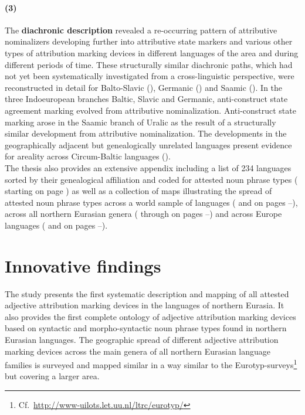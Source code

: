\paragraph{(3)} The {\bf diachronic description} revealed a re-occurring pattern of attributive nominalizers developing further into attributive state markers and various other types of attribution marking devices in different languages of the area and during different periods of time. These structurally similar diachronic paths, which had not yet been systematically investigated from a cross-linguistic perspective, were reconstructed in detail for Balto-Slavic (), Germanic () and Saamic (). In the three Indoeuropean branches Baltic, Slavic and Germanic, anti-construct state agreement marking evolved from attributive nominalization. Anti-construct state marking arose in the Saamic branch of Uralic as the result of a structurally similar development from attributive nominalization. The developments in the geographically adjacent but genealogically unrelated languages present evidence for areality across Circum-Baltic languages ().\\

\noindent The thesis also provides an extensive appendix including a list of 234 languages sorted by their genealogical affiliation and coded for attested noun phrase types ( starting on page \pageref{sample}) as well as a collection of maps illustrating the spread of attested noun phrase types across a world sample of languages ( and  on pages \pageref{WorldMap}–\pageref{WorldMapTyp}), across all northern Eurasian genera ( through  on pages \pageref{NEMap}–\pageref{NAMapTyp}) and across Europe languages ( and  on pages \pageref{EUMap}–\pageref{EUMapTyp}).

\section{Innovative findings}
The study presents the first systematic description and mapping of all attested adjective attribution marking devices in the languages of northern Eurasia. It also provides the first complete ontology of adjective attribution marking devices based on syntactic and morpho-syntactic noun phrase types found in northern Eurasian languages. The geographic spread of different adjective attribution marking devices across the main genera of all northern Eurasian language families is surveyed and mapped similar in a way similar to the Eurotyp-surveys\footnote{Cf.~\url{http://www-uilots.let.uu.nl/ltrc/eurotyp/}} but covering a larger area. 

